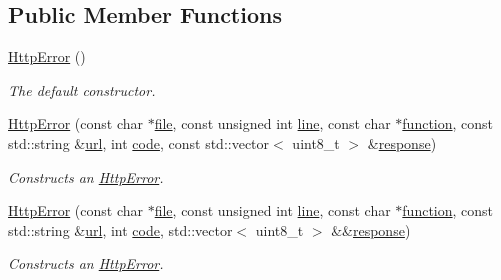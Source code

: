 \subsection*{Public Member Functions}
\begin{DoxyCompactItemize}
\item 
\hyperlink{group___network_module_ga14eeb0f4441dfb8f75d82c0cd940c0ec}{Http\+Error} ()
\begin{DoxyCompactList}\small\item\em The default constructor. \end{DoxyCompactList}\item 
\hyperlink{group___network_module_ga03929fda967c6a3609d28953ac0fad55}{Http\+Error} (const char $\ast$\hyperlink{group___utility_module_ga0b75e32780cb8534179ff3c060739496}{file}, const unsigned int \hyperlink{group___utility_module_ga13437b5caffe754b7a32fc3c514907e5}{line}, const char $\ast$\hyperlink{group___utility_module_gaa69c98222c56544a9094154a8eab4db9}{function}, const std\+::string \&\hyperlink{group___network_module_ga979dcee6ab51c4f6be456ae242c8f90b}{url}, int \hyperlink{group___network_module_ga7dcace94fa3fc37b1f0f6881438c6446}{code}, const std\+::vector$<$ uint8\+\_\+t $>$ \&\hyperlink{group___network_module_gac1cbcd7696b0048a61231953d2aad0d7}{response})
\begin{DoxyCompactList}\small\item\em Constructs an \hyperlink{classdg_1_1deepcore_1_1network_1_1_http_error}{Http\+Error}. \end{DoxyCompactList}\item 
\hyperlink{group___network_module_gaacf30b407e830bcfc3a15b14c6bcda3f}{Http\+Error} (const char $\ast$\hyperlink{group___utility_module_ga0b75e32780cb8534179ff3c060739496}{file}, const unsigned int \hyperlink{group___utility_module_ga13437b5caffe754b7a32fc3c514907e5}{line}, const char $\ast$\hyperlink{group___utility_module_gaa69c98222c56544a9094154a8eab4db9}{function}, const std\+::string \&\hyperlink{group___network_module_ga979dcee6ab51c4f6be456ae242c8f90b}{url}, int \hyperlink{group___network_module_ga7dcace94fa3fc37b1f0f6881438c6446}{code}, std\+::vector$<$ uint8\+\_\+t $>$ \&\&\hyperlink{group___network_module_gac1cbcd7696b0048a61231953d2aad0d7}{response})
\begin{DoxyCompactList}\small\item\em Constructs an \hyperlink{classdg_1_1deepcore_1_1network_1_1_http_error}{Http\+Error}. \end{DoxyCompactList}\item 

\end{DoxyCompactItemize}
